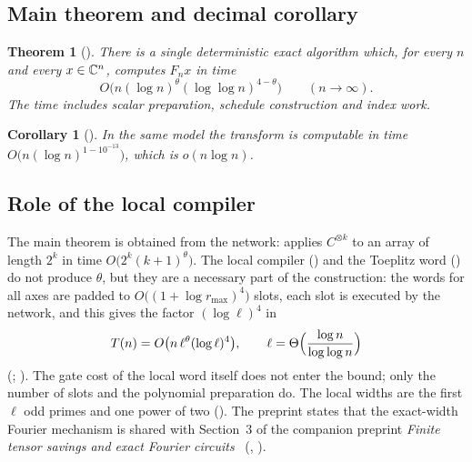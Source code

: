 \documentclass[11pt]{article}
\theoremstyle{plain}
\newtheorem{theorem}{Theorem}
\newtheorem{corollary}{Corollary}
\begin{document}
\subsection{Main theorem and decimal corollary}
\begin{theorem}[{\citep[Theorem~]{openai2026}}]\label{thm:main}
There is a single deterministic exact algorithm which, for every $n$ and every $x\in\mathbb{C}^n$, computes $F_nx$ in time
\begin{equation}\label{eq:main-bound}
O\bigl(n(\log n)^{\theta}(\log\log n)^{4-\theta}\bigr)\qquad(n\to\infty).
\end{equation}
The time includes scalar preparation, schedule construction and index work.
\end{theorem}

\begin{corollary}[{\citep[Corollary~]{openai2026}}]\label{cor:decimal}
In the same model the transform is computable in time $O\bigl(n(\log n)^{1-10^{-13}}\bigr)$, which is $o(n\log n)$.
\end{corollary}

\subsection{Role of the local compiler}\label{sec:role}
The main theorem is obtained from the network:  applies $C^{\otimes k}$ to an array of length $2^k$ in time $O\bigl(2^k(k+1)^{\theta}\bigr)$. The local compiler () and the Toeplitz word () do not produce $\theta$, but they are a necessary part of the construction: the words for all axes are padded to $O\bigl((1+\log r_{\max})^4\bigr)$ slots, each slot is executed by the network, and this gives the factor $(\log\ell)^4$ in
\begin{equation}\label{eq:Tn}
T(n)=O\bigl(n\,\ell^{\theta}(\log\ell)^4\bigr),\qquad \ell=\Theta\Bigl(\frac{\log n}{\log\log n}\Bigr)
\end{equation}
(; ). The gate cost of the local word itself does not enter the bound; only the number of slots and the polynomial preparation do. The local widths are the first $\ell$ odd primes and one power of two (). The preprint states that the exact-width Fourier mechanism is shared with Section~3 of the companion preprint \emph{Finite tensor savings and exact Fourier circuits}~\citep{openai2026companion} (, ).
\end{document}
